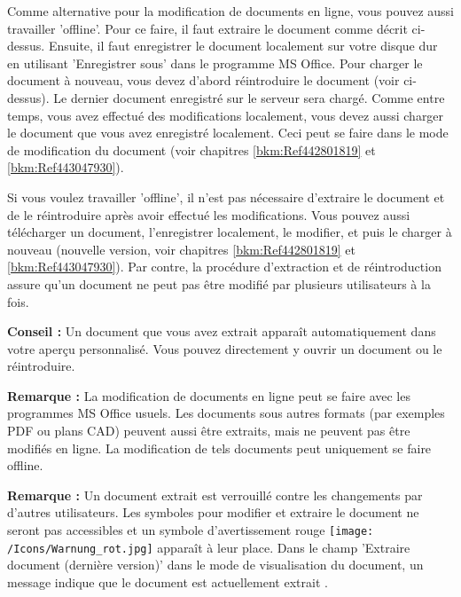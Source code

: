 Comme alternative pour la modification de documents en ligne, vous pouvez aussi travailler 'offline'. Pour ce faire, il faut extraire le document comme décrit ci-dessus. Ensuite, il faut enregistrer le document localement sur votre disque dur en utilisant 'Enregistrer sous' dans le programme MS Office. Pour charger le document à nouveau, vous devez d'abord réintroduire le document (voir ci-dessus).
Le dernier document enregistré sur le serveur sera chargé. Comme entre temps, vous avez effectué des modifications localement, vous devez aussi charger le document que vous avez enregistré localement. Ceci peut se faire dans le mode de modification du document (voir chapitres \ref{bkm:Ref442801819} et \ref{bkm:Ref443047930}). \newline

Si vous voulez travailler 'offline', il n'est pas nécessaire d'extraire le document et de le réintroduire après avoir effectué les modifications. Vous pouvez aussi télécharger un document, l'enregistrer localement, le modifier, et puis le charger à nouveau (nouvelle version, voir chapitres \ref{bkm:Ref442801819} et \ref{bkm:Ref443047930}). Par contre, la procédure d'extraction et de réintroduction assure qu'un document ne peut pas être modifié par plusieurs utilisateurs à la fois.

\vspace{\baselineskip}

\textbf{Conseil :} Un document que vous avez extrait apparaît automatiquement dans votre aperçu personnalisé. Vous pouvez directement y ouvrir un document ou le réintroduire. \newline


\textbf{Remarque :} La modification de documents en ligne peut se faire avec les programmes MS Office usuels. Les documents sous autres formats (par exemples PDF ou plans CAD) peuvent aussi être extraits, mais ne peuvent pas être modifiés en ligne. La modification de tels documents peut uniquement se faire offline. \newline


\textbf{Remarque :} Un document extrait est verrouillé contre les changements par d'autres utilisateurs. Les symboles pour modifier et extraire le document ne seront pas accessibles et un symbole d'avertissement rouge \texttt{[image: /Icons/Warnung\_rot.jpg]}  apparaît à leur place. Dans le champ 'Extraire document (dernière version)' dans le mode de visualisation du document, un message indique que le document est actuellement extrait .

